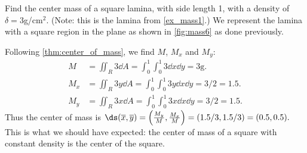 \begin{example}\label{ex_mass6}%
Find the center mass of a square lamina, with side length 1, with a density of $\delta = 3$g/cm$^2$. (Note: this is the lamina from \autoref{ex_mass1}.)
\solution
We represent the lamina with a square region in the plane as shown in \autoref{fig:mass6} as done previously. 

Following \autoref{thm:center_of_mass}, we find $M$, $M_x$ and $M_y$:
%
%
\begin{align*}
M &= \iint_R 3\dd A = \int_0^1\int_0^1 3\dd x\dd y =3\text{g}.\\
M_x &= \iint_R 3y\dd A = \int_0^1\int_0^1 3y\dd x\dd y =3/2 = 1.5.\\
M_y &= \iint_R 3x\dd A = \int_0^1\int_0^1 3x\dd x\dd y =3/2 = 1.5.
\end{align*}
Thus the center of mass is $\ds (\overline{x},\overline{y}) = \left(\frac{M_y}M,\frac{M_x}M\right) = (1.5/3,1.5/3) = (0.5,0.5).$ This is what we should have expected: the center of mass of a square with constant density is the center of the square.
\end{example}

